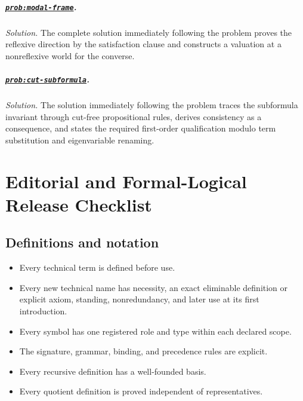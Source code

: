 \documentclass[11pt,oneside,openany]{book}
\theoremstyle{definition}
\theoremstyle{plain}
\theoremstyle{remark}
\begin{document}
\paragraph{\hyperref[prob:modal-frame]{\texttt{prob:modal-frame}}.}
\textit{Solution.}  The complete solution immediately following the problem
proves the reflexive direction by the satisfaction clause and constructs a
valuation at a nonreflexive world for the converse.

\paragraph{\hyperref[prob:cut-subformula]{\texttt{prob:cut-subformula}}.}
\textit{Solution.}  The solution immediately following the problem traces the
subformula invariant through cut-free propositional rules, derives consistency
as a consequence, and states the required first-order qualification modulo term
substitution and eigenvariable renaming.

\chapter{Editorial and Formal-Logical Release Checklist}
\label{ch:release-checklist}
\label{app:release-checklist}

\section{Definitions and notation}
\label{sec:release-checklist-01}
\begin{itemize}
  \item Every technical term is defined before use.
  \item Every new technical name has necessity, an exact eliminable definition
        or explicit axiom, standing, nonredundancy, and later use at its first
        introduction.
  \item Every symbol has one registered role and type within each declared
        scope.
  \item The signature, grammar, binding, and precedence rules are explicit.
  \item Every recursive definition has a well-founded basis.
  \item Every quotient definition is proved independent of representatives.
\end{itemize}
\end{document}
